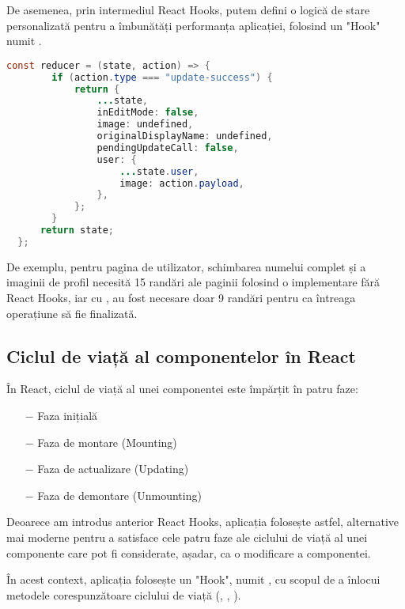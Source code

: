 De asemenea, prin intermediul React Hooks, putem defini o logică de stare personalizată pentru a îmbunătăți performanța aplicației, folosind un "Hook" numit .\newline

\begin{lstlisting}[language=Java]
	const reducer = (state, action) => {
		if (action.type === "update-success") {
			return {
				...state,
				inEditMode: false,
				image: undefined,
				originalDisplayName: undefined,
				pendingUpdateCall: false,
				user: {
					...state.user,
					image: action.payload,
				},
			};
		}
	  return state;
  };
\end{lstlisting}
\bigskip

De exemplu, pentru pagina de utilizator, schimbarea numelui complet și a imaginii de profil necesită 15 randări ale paginii folosind o implementare fără React Hooks, iar cu , au fost necesare doar 9 randări pentru ca întreaga operațiune să fie finalizată.\newline

\subsection{Ciclul de viață al componentelor în React}

În React, ciclul de viață al unei componentei este împărțit în patru faze:

\begin{itemize}
	\addtolength{\itemindent}{1cm}
	\item[$-$]Faza inițială
	\item[$-$]Faza de montare (Mounting)
	\item[$-$]Faza de actualizare (Updating)
	\item[$-$]Faza de demontare (Unmounting)
	\newline
\end{itemize}

Deoarece am introdus anterior React Hooks, aplicația folosește astfel, alternative mai moderne pentru a satisface cele patru faze ale ciclului de viață al unei componente care pot fi considerate, așadar, ca o modificare a componentei.\newline

În acest context, aplicația folosește un "Hook", numit , cu scopul de a înlocui metodele corespunzătoare ciclului de viață (, , ).\newline


